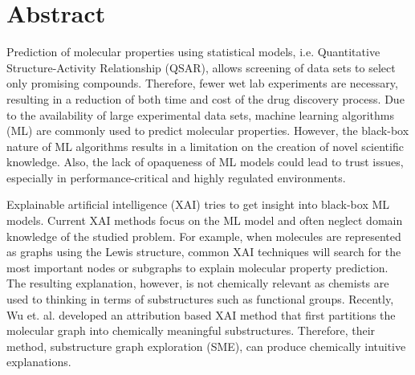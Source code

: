 \chapter{Abstract}


Prediction of molecular properties using statistical models, i.e. Quantitative 
Structure-Activity Relationship (QSAR)\cite{vandeWaterbeemdCarterGrassyKubinyiMartinTuteWillett, hansch1962correlation}, 
allows screening of data sets to select 
only promising compounds. Therefore, fewer wet lab experiments are necessary, 
resulting in a reduction of both time and cost of the drug discovery process.\cite{adelusi2022molecular} 
Due to the availability of large experimental data sets, machine learning 
algorithms (ML) are commonly used to predict molecular properties.\cite{wu2018moleculenet, gorgulla2022emerging, tropsha2024integrating} 
However, the black-box nature of ML algorithms 
results in a limitation on the creation of novel scientific knowledge. Also, 
the lack of opaqueness of ML models could lead to trust issues, especially 
in performance-critical and highly regulated environments.\cite{carvalho2019machine}


% 


Explainable artificial intelligence (XAI) tries to get insight into black-box 
ML models.\cite{carvalho2019machine, yuan2022explainability} 
Current XAI methods focus on the ML model and often neglect domain 
knowledge of the studied problem. For example, when molecules are represented 
as graphs using the Lewis structure\cite{ahmad1992drawing}, common XAI techniques will search for the 
most important nodes or subgraphs to explain molecular property prediction.\cite{wu2023chemistry} The 
resulting explanation, however, is not chemically relevant as chemists are used 
to thinking in terms of substructures such as functional groups. Recently, Wu et. 
al. developed an attribution based XAI method that first partitions the molecular graph into 
chemically meaningful substructures. Therefore, their method, substructure graph 
exploration (SME), can produce chemically intuitive explanations.\cite{wu2023chemistry}


